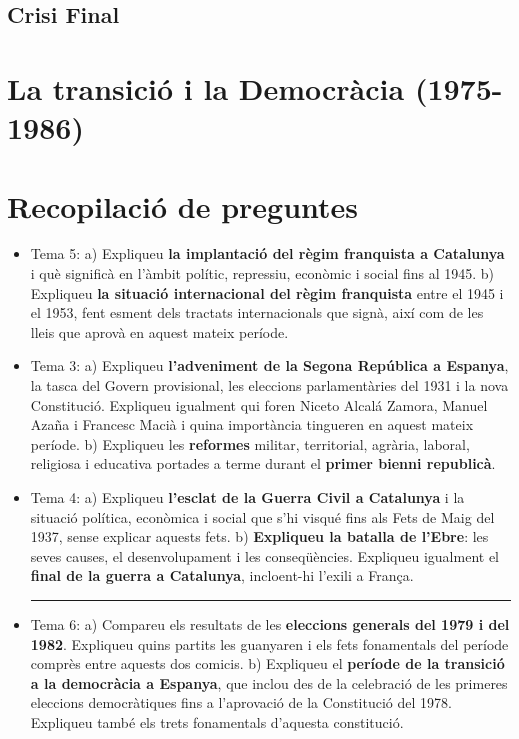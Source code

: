 \documentclass[arial,a4paper,print]{article}
\begin{document}
\subsection{Crisi Final}

\section{La transició i la Democràcia (1975-1986)}

\pagebreak

\section{Recopilació de preguntes}

\begin{itemize}
\item Tema 5: 
\subitem a) Expliqueu \textbf{la implantació del règim franquista a Catalunya} i què significà en l’àmbit polític, repressiu, econòmic i social fins al 1945.
\subitem b) Expliqueu  \textbf{la  situació  internacional  del  règim  franquista}  entre  el  1945  i  el  1953,  fent  esment  dels  tractats  internacionals  que  signà,  així  com  de  les  lleis  que  aprovà  en  aquest  mateix període.

\item Tema 3: 
\subitem a) Expliqueu \textbf{l’adveniment de la Segona República a Espanya}, la tasca del Govern provisional, les eleccions parlamentàries del 1931 i la nova Constitució. Expliqueu igualment qui foren Niceto Alcalá Zamora, Manuel Azaña i Francesc Macià i quina importància tingueren en aquest mateix període. 
\subitem b) Expliqueu les \textbf{reformes} militar, territorial, agrària, laboral, religiosa i educativa portades a terme durant el \textbf{primer bienni republicà}.

\item Tema 4:
\subitem a) Expliqueu \textbf{l’esclat de la Guerra Civil a Catalunya} i la situació política, econòmica i social que s’hi visqué fins als Fets de Maig del 1937, sense explicar aquests fets.
\subitem b) \textbf{Expliqueu  la  batalla  de  l’Ebre}:  les  seves  causes,  el  desenvolupament  i  les  conseqüències.  Expliqueu igualment el \textbf{final de la guerra a Catalunya}, incloent-hi l’exili a França.

\noindent\rule{\linewidth}{0.4pt}

\item Tema 6:
\subitem a) Compareu els resultats de les \textbf{eleccions generals del 1979 i del 1982}. Expliqueu quins partits les guanyaren i els fets fonamentals del període comprès entre aquests dos comicis.
\subitem b) Expliqueu el \textbf{període de la transició a la democràcia a Espanya}, que inclou des de la celebració  de  les  primeres  eleccions  democràtiques  fins  a  l’aprovació  de  la  Constitució  del  1978. Expliqueu també els trets fonamentals d’aquesta constitució.


\end{itemize}
\end{document}
